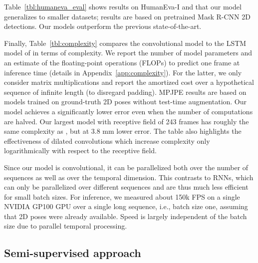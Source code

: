 \documentclass[10pt,twocolumn,letterpaper]{article}
\begin{document}
Table~\ref{tbl:humaneva_eval} shows results on HumanEva-I and that our model generalizes to smaller datasets; results are based on pretrained Mask R-CNN 2D detections. 
Our models outperform the previous state-of-the-art. 



Finally, Table~\ref{tbl:complexity} compares the convolutional model to the LSTM model of \cite{hossain:exploiting:2018} in terms of complexity. 
We report the number of model parameters and an estimate of the floating-point operations (FLOPs) to predict one frame at inference time (details in Appendix~\ref{app:complexity}). 
For the latter, we only consider matrix multiplications and report the amortized cost over a hypothetical sequence of infinite length (to disregard padding). 
MPJPE results are based on models trained on ground-truth 2D poses without test-time augmentation. 
Our model achieves a significantly lower error even when the number of computations are halved.
Our largest model with receptive field of 243 frames has roughly the same complexity as \cite{hossain:exploiting:2018}, but at 3.8 mm lower error. 
The table also highlights the effectiveness of dilated convolutions which increase complexity only logarithmically with respect to the receptive field.

Since our model is convolutional, it can be parallelized both over the number of sequences as well as over the temporal dimension. This contrasts to RNNs, which can only be parallelized over different sequences and are thus much less efficient for small batch sizes.
For inference, we measured about 150k FPS on a single NVIDIA GP100 GPU over a single long sequence, i.e., batch size one, assuming that 2D poses were already available. Speed is largely independent of the batch size due to parallel temporal processing.



\subsection{Semi-supervised approach}
\label{sec:semi_eval}
\end{document}
